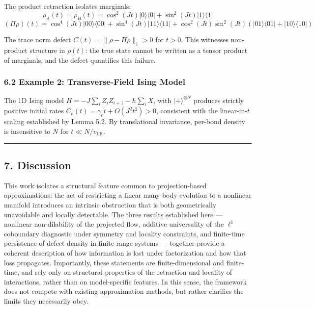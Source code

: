\documentclass[
]{article}
\begin{document}
The product retraction isolates marginals:
\[\rho_A(t) = \rho_B(t) = \cos^2(Jt)|{0}\rangle\langle{0}| + \sin^2(Jt)|{1}\rangle\langle{1}|\]
\[(\Pi\rho)(t) = \cos^4(Jt)|{00}\rangle\langle{00}| + \sin^4(Jt)|{11}\rangle\langle{11}| + \cos^2(Jt)\sin^2(Jt)(|{01}\rangle\langle{01}| + |{10}\rangle\langle{10}|)\]

The trace norm defect \(C(t) = \|\rho - \Pi\rho\|_1 > 0\) for \(t > 0\).
This witnesses non-product structure in \(\rho(t)\): the true state
cannot be written as a tensor product of marginals, and the defect
quantifies this failure.

\subsubsection{6.2 Example 2: Transverse-Field Ising
Model}\label{example-2-transverse-field-ising-model}

The 1D Ising model \(H = -J\sum_i Z_i Z_{i+1} - h\sum_i X_i\) with
\(|{+}\rangle^{\otimes N}\) produces strictly positive initial rates
\(C_e(t) = \gamma_e t + O(J^2 t^2) > 0\), consistent with the
linear-in-\(t\) scaling established by Lemma 5.2. By translational
invariance, per-bond density is insensitive to \(N\) for
\(t \ll N/v_{\text{LR}}\).

\begin{center}\rule{0.5\linewidth}{0.5pt}\end{center}

\subsection{7. Discussion}\label{discussion}

This work isolates a structural feature common to projection-based
approximations: the act of restricting a linear many-body evolution to a
nonlinear manifold introduces an intrinsic obstruction that is both
geometrically unavoidable and locally detectable. The three results
established here --- nonlinear non-dilability of the projected flow,
additive universality of the \(\ell^1\) coboundary diagnostic under
symmetry and locality constraints, and finite-time persistence of defect
density in finite-range systems --- together provide a coherent
description of how information is lost under factorization and how that
loss propagates. Importantly, these statements are finite-dimensional
and finite-time, and rely only on structural properties of the
retraction and locality of interactions, rather than on model-specific
features. In this sense, the framework does not compete with existing
approximation methods, but rather clarifies the limits they necessarily
obey.
\end{document}

